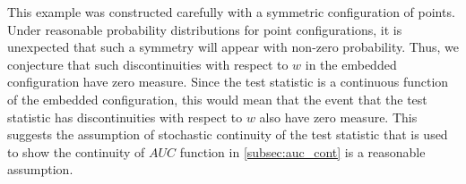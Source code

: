 \documentclass[12pt,oneside,final]{thesis}
\begin{document}

\begin{knitrout}
\color{fgcolor}\begin{kframe}


{\ttfamily\noindent\bfseries{}}

{\ttfamily\noindent\bfseries\color{errorcolor}{\#\# Error: object 'g2' not found}}\end{kframe}
\end{knitrout}



This example was constructed carefully with a symmetric configuration of points. Under reasonable probability distributions for point configurations, it is unexpected that such a symmetry will appear with non-zero probability. Thus, we conjecture that such discontinuities with respect to $w$ in the embedded configuration  have zero measure. Since the test statistic is a continuous function of the embedded configuration, this would mean that the event that the test statistic has discontinuities with respect to $w$ also have zero measure. This suggests the assumption of stochastic continuity of the test statistic  that is used to show the continuity of $AUC$ function in \autoref{subsec:auc_cont} is a reasonable assumption.

\end{document}
